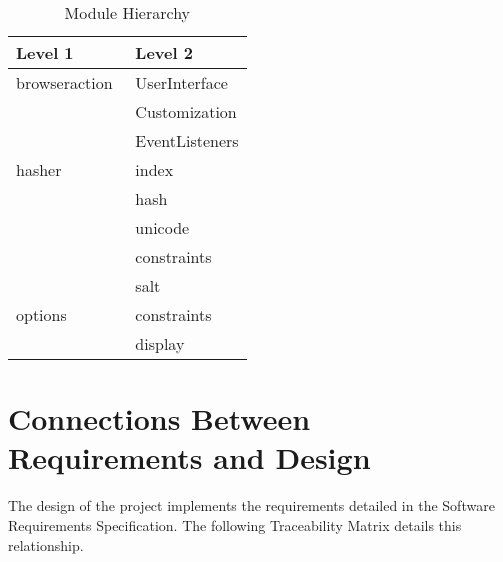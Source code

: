 \documentclass[12pt]{article}
\begin{document}
\newpage
\begin{table}
\caption{Module Hierarchy}
\begin{tabular}{|p{0.5\linewidth} || p{0.5\linewidth}|}
\hline
Level 1 & Level 2 \\
\hline
browseraction & UserInterface\\
& Customization \\
& EventListeners \\
\hline
hasher & index\\
& hash \\
& unicode \\
& constraints \\
& salt \\
\hline
options & constraints \\
& display\\
\hline
\end{tabular}
\end{table}
\newpage

\section{Connections Between Requirements and Design}
The design of the project implements the requirements detailed in the Software Requirements Specification.  The following Traceability Matrix details this relationship.
\end{document}
